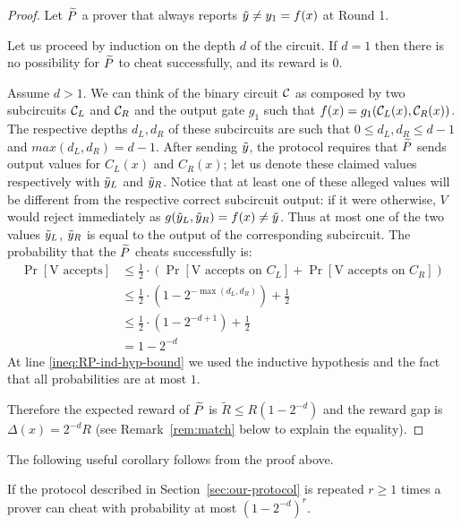 \begin{proof}
Let $\widetilde{P}$ a prover that always reports $\tilde{y} \neq y_1 = f(x)$ at Round 1. 

Let us proceed by induction on the depth $d$ of the circuit.
If $d = 1$ then there is no possibility for $\widetilde{P}$ to cheat successfully, and its 
reward is $0$. 

Assume $d > 1$. We can think of the binary circuit $\cal C$ as composed by two 
subcircuits ${\cal C}_L$ and ${\cal C}_R$ and the output gate $g_1$ such that
$f(x) = g_1({\cal C}_L(x), {\cal C}_R(x))$. The respective depths $d_L, d_R$ of these 
subcircuits are such that $0 \leq d_L, d_R \leq d-1$ and $max(d_L,d_R)=d-1$. After sending 
$\tilde{y}$, 
the protocol requires that
$\widetilde{P}$ sends output values for $C_L(x)$ and
$C_R(x)$; let us denote these claimed values respectively with $\tilde{y}_L$ 
and  $\tilde{y}_R$. 
Notice that at least one of these alleged values will be different from the 
respective correct subcircuit output: if it were otherwise, $V$ would 
reject immediately as $g(\tilde{y}_L, \tilde{y}_R) = f(x) \neq \tilde{y}$.
Thus at most one of the two values $\tilde{y}_L$, $\tilde{y}_R$ is equal 
to the output of the corresponding subcircuit.
The probability that the $\widetilde{P}$ cheats successfully is:
\begin{align}
\Pr[\mbox{V accepts}] & \leq 
\frac{1}{2}\cdot(\Pr[\mbox{V accepts on } C_L] + \Pr[\mbox{V accepts on } C_R]) 
\label{ineq:RP-formula-vs-circuit}
\\
& \leq \frac{1}{2}\cdot(1-2^{-\max(d_L, d_R)}) + \frac{1}{2} 
\label{ineq:RP-ind-hyp-bound} \\
& \leq \frac{1}{2}\cdot(1-2^{-d+1}) + \frac{1}{2} \\
& = 1 - 2^{-d}
\end{align}
At line \ref{ineq:RP-ind-hyp-bound} we used the inductive hypothesis and the 
fact 
that all probabilities are at most $1$.

Therefore the expected reward of $\widetilde{P}$ is $\tilde{R} \leq R(1-2^{-d})$ and the reward 
gap is $\Delta(x) = 2^{-d}R$ (see Remark~\ref{rem:match} below to explain the equality). 
\end{proof}

The following useful corollary follows from the proof above.
\begin{mycorollary}
	\label{cor:repetitions}
	If the protocol described in Section~\ref{sec:our-protocol} is repeated $r \geq 1$ times a prover can cheat with probability at most $(1-2^{-d})^r$. 
\end{mycorollary}

